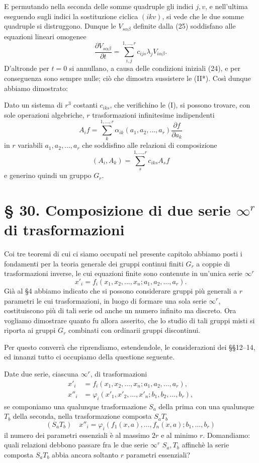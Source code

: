 \documentclass[11pt]{book}
\begin{document}
E permutando nella seconda delle somme quadruple gli indici $j,v$, e nell'ultima eseguendo sugli indici la sostituzione ciclica $(ikv)$, si vede che le due somme quadruple si distruggono. Dunque le $V_{s\alpha\beta}$ definite dalla (25) soddisfano alle equazioni lineari omogenee
\[
 \frac{\partial V_{s\alpha\beta}}{\partial t}
 =\sum\limits_{i,j}^{1,\ldots,r}c_{ijs}\lambda_jV_{i\alpha\beta}.
\]
D'altronde per $t=0$ si annullano, a causa delle condizioni iniziali (24), e per conseguenza sono sempre nulle; ciò che dimostra sussistere le (II*). Così dunque abbiamo dimostrato:

Dato un sistema di $r^3$ costanti $c_{iks}$, che verifichino le (I), si possono trovare, con sole operazioni algebriche, $r$ trasformazioni infinitesime indipendenti
\[
 A_i f=\sum\limits_k^{1,\ldots,r}\alpha_{ik}(a_1,a_2,\ldots,a_r)\frac{\partial f}{\partial a_k}
\]
in $r$ variabili $a_1,a_2,\ldots,a_r$ che soddisfino alle relazioni di composizione
\[
 (A_i,A_k)=\sum\limits_s^{1,\ldots,r} c_{iks}A_s f
\]
e generino quindi un gruppo $G_r$.

\section*{\S{} 30. Composizione di due serie $\infty^r$ di trasformazioni}

Coi tre teoremi di cui ci siamo occupati nel presente capitolo abbiamo posti i fondamenti per la teoria generale dei gruppi continui finiti $G_r$ a coppie di trasformazioni inverse, le cui equazioni finite sono contenute in un'unica serie $\infty^r$
\[
 x'_i=f_i(x_1,x_2,\ldots,x_n;a_1,a_2,\ldots,a_r).
\]
Già al \S{}4 abbiamo indicato che si possono considerare gruppi più generali a $r$ parametri le cui trasformazioni, in luogo di formare una sola serie $\infty^r$, costituiscono più di tali serie od anche un numero infinito ma discreto. Ora vogliamo dimostrare quanto fu allora asserito, che lo studio di tali gruppi misti si riporta ai gruppi $G_r$ combinati con ordinarii gruppi discontinui.

Per questo converrà che riprendiamo, estendendole, le considerazioni dei \S\S{}12--14, ed innanzi tutto ci occupiamo della questione seguente.

Date due serie, ciascuna $\infty^r$, di trasformazioni
\begin{align*}
 x'_i&=f_i(x_1,x_2,\ldots,x_n;a_1,a_2,\ldots,a_r), \tag{26}\\
 x''_i&=\varphi_i(x'_1,x'_2,\ldots,x'_n;b_1,b_2,\ldots,b_r), \tag{27}
\end{align*}
se componiamo una qualunque trasformazione $S_a$ della prima con una qualunque $T_b$ della seconda, nella trasformazione composta $S_aT_b$
\[
 (S_aT_b)\quad
 x''_i=\varphi_i(f_1(x,a),\ldots,f_n(x,a);b_1,\ldots,b_r)
\]
il numero dei parametri essenziali è al massimo $2r$ e al minimo $r$\begingroup\renewcommand\thefootnote{(*)}\footnotemark\endgroup.\begingroup\renewcommand\thefootnote{(*)}\endgroup{} Domandiamo: quali relazioni debbono passare fra le due serie $\infty^r$ $S_a,T_b$ affinchè la serie composta $S_aT_b$ abbia ancora soltanto $r$ parametri essenziali?
\end{document}
